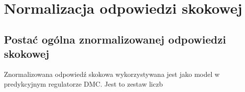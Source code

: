 \chapter{Normalizacja odpowiedzi skokowej}
\label{zad3}

\section{Postać ogólna znormalizowanej odpowiedzi skokowej}
Znormalizowana odpowiedź skokowa wykorzystywana jest jako model w predykcyjnym
regulatorze DMC. Jest to zestaw liczb 